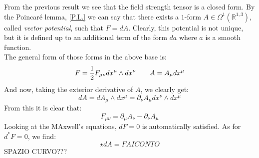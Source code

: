 \documentclass[12pt,a4paper]{report}
\theoremstyle{definition}
\theoremstyle{Theorem}
\theoremstyle{definition}
\theoremstyle{definition}
\begin{document}
	From the previous result we see that the field strength tensor is a closed form. By the Poincaré lemma, \ref{P.L.} we can say that there exists a $1$-form $A\in\Omega^1(\mathbb{R}^{1,3})$, called \textit{vector potential}, such that $F=dA$. Clearly, this potential is not unique, but it is defined up to an additional term of the form $da$ where $a$ is a smooth function.\\
	The general form of those forms in the above base is:
	$$F={1\over 2}F_{\mu\nu}dx^\mu\wedge dx^\nu\hspace{20 pt} A=A_\mu dx^\mu$$
	And now, taking the exterior derivative of $A$, we clearly get:
	$$dA=dA_\mu\wedge dx^\mu=\partial_\nu A_\mu dx^\nu\wedge dx^\mu$$
	From this it is clear that:
	$$F_{\mu\nu}=\partial_\mu A_\nu-\partial_\nu A_\mu$$
	Looking at the MAxwell's equations, $dF=0$ is automatically satisfied. As for $d^*F=0$, we find:
	$$\star dA= FAI CONTO$$
	SPAZIO CURVO???
\end{document}
